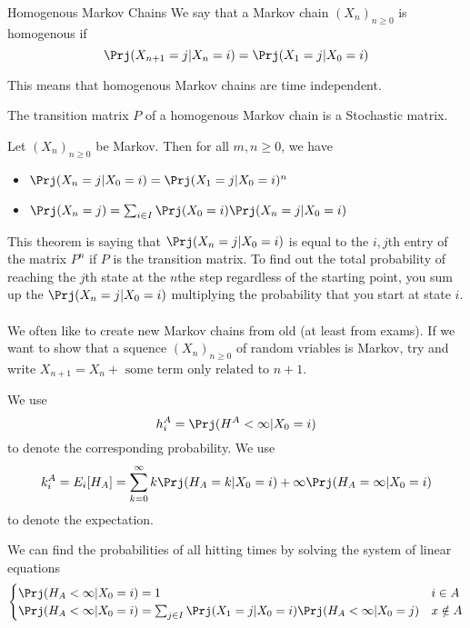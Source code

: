 \documentclass[a4paper]{article}
\begin{document}
\begin{defn}{Homogenous Markov Chains}{} We say that a Markov chain $(X_n)_{n\geq 0}$ is homogenous if $$\Prj(X_{n+1}=j|X_n=i)=\Prj(X_1=j|X_0=i)$$
\end{defn}

This means that homogenous Markov chains are time independent. 

\begin{lmm}{}{} The transition matrix $P$ of a homogenous Markov chain is a Stochastic matrix. 
\end{lmm}

\begin{thm}{}{} Let $(X_n)_{n\geq 0}$ be Markov. Then for all $m,n\geq0$, we have
\begin{itemize}
\item $\Prj(X_n=j|X_0=i)=\Prj(X_1=j|X_0=i)^n$
\item $\Prj(X_n=j)=\sum_{i\in I}\Prj(X_0=i)\Prj(X_n=j|X_0=i)$
\end{itemize}
\end{thm}

This theorem is saying that $\Prj(X_n=j|X_0=i)$ is equal to the $i,j$th entry of the matrix $P^n$ if $P$ is the transition matrix. To find out the total probability of reaching the $j$th state at the $n$the step regardless of the starting point, you sum up the $\Prj(X_n=j|X_0=i)$ multiplying the probability that you start at state $i$. \\~\\

We often like to create new Markov chains from old (at least from exams). If we want to show that a squence $(X_n)_{n\geq 0}$ of random vriables is Markov, try and write $X_{n+1}=X_n+\text{ some term only related to }n+1$. 

We use $$h_i^A=\Prj(H^A<\infty|X_0=i)$$ to denote the corresponding probability. We use $$k_i^A=E_i[H_A]=\sum_{k=0}^\infty k\Prj(H_A=k|X_0=i)+\infty\Prj(H_A=\infty|X_0=i)$$ to denote the expectation. 

\begin{prp}{}{} We can find the probabilities of all hitting times by solving the system of linear equations $$\begin{cases}
\Prj(H_A<\infty|X_0=i)=1 & i\in A\\
\Prj(H_A<\infty|X_0=i)=\sum_{j\in I}\Prj(X_1=j|X_0=i)\Prj(H_A<\infty|X_0=j) & x\notin A
\end{cases}$$
\end{prp}
\end{document}

